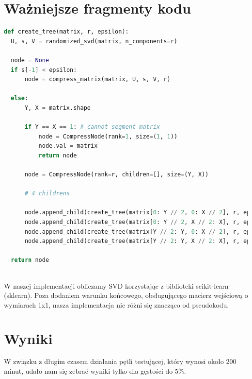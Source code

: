 \documentclass{article}
\begin{document}
\section{Ważniejsze fragmenty kodu}
\begin{lstlisting}[language=Python]
  def create_tree(matrix, r, epsilon):
  U, s, V = randomized_svd(matrix, n_components=r)
  
  node = None
  if s[-1] < epsilon:
      node = compress_matrix(matrix, U, s, V, r)
  
  else:
      Y, X = matrix.shape
      
      if Y == X == 1: # cannot segment matrix
          node = CompressNode(rank=1, size=(1, 1))
          node.val = matrix
          return node
      
      node = CompressNode(rank=r, children=[], size=(Y, X))
      
      # 4 childrens
      
      node.append_child(create_tree(matrix[0: Y // 2, 0: X // 2], r, epsilon))
      node.append_child(create_tree(matrix[0: Y // 2, X // 2: X], r, epsilon))
      node.append_child(create_tree(matrix[Y // 2: Y, 0: X // 2], r, epsilon))
      node.append_child(create_tree(matrix[Y // 2: Y, X // 2: X], r, epsilon))
      
  return node
    
\end{lstlisting}


W naszej implementacji obliczamy SVD korzystając z biblioteki scikit-learn (sklearn). Poza dodaniem warunku końcowego, obsługującego macierz wejściową o wymiarach 1x1, nasza implementacja nie różni się znacząco od pseudokodu.

\section{Wyniki}

W związku z długim czasem działania pętli testującej, który wynosi około 200 minut, udało nam się zebrać wyniki tylko dla gęstości do 5\%.
\end{document}
